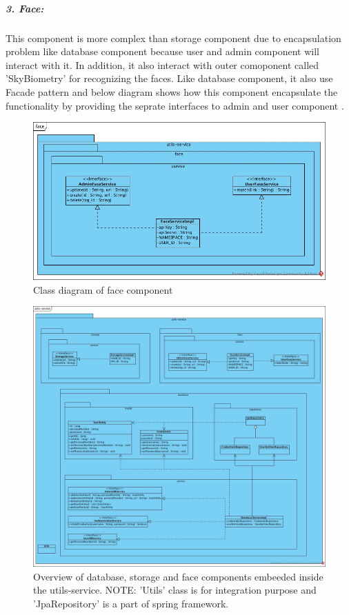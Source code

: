 \documentclass[a4paper,11pt]{article}
\begin{document}
\subparagraph{3. Face: }This component is more complex than storage component due to encapsulation problem like database component because user and admin component will interact with it. In addition, it also interact with outer comoponent called 'SkyBiometry' for recognizing the faces. Like database component, it also use Facade pattern and below diagram shows how this component encapsulate the functionality by providing the seprate interfaces to admin and user component .

\begin{figure}[ht!]
    \centering
	\includegraphics[width=125mm]{ClassDiagrams/new/face.jpg}
	\caption{Class diagram of face component}
\end{figure}

\newpage
\begin{figure}[ht!]
 \centering
    \includegraphics[width=170mm]{ClassDiagrams/new/utils-service.jpg}
    \caption{Overview of database, storage and face components embeeded inside the utils-service.
    \newline
    NOTE: 'Utils' class is for integration purpose and 'JpaRepository' is a part of spring framework.}
\end{figure}
\end{document}
